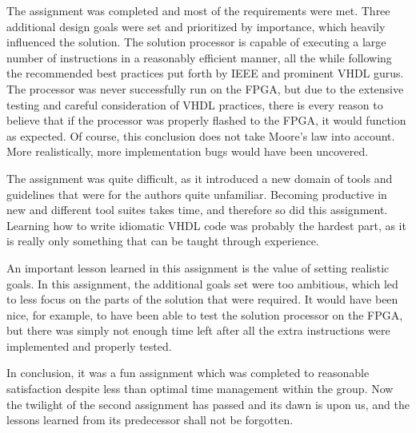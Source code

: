 The assignment was completed and most of the requirements were met.
Three additional design goals were set and prioritized by importance, which heavily influenced the solution.
The solution processor is capable of executing a large number of instructions in a reasonably efficient manner, all the while following the recommended best practices put forth by IEEE and prominent VHDL gurus.
The processor was never successfully run on the FPGA, but due to the extensive testing and careful consideration of VHDL practices, there is every reason to believe that if the processor was properly flashed to the FPGA, it would function as expected.
Of course, this conclusion does not take Moore's law into account.
More realistically, more implementation bugs would have been uncovered.

The assignment was quite difficult, as it introduced a new domain of tools and guidelines that were for the authors quite unfamiliar.
Becoming productive in new and different tool suites takes time, and therefore so did this assignment.
Learning how to write idiomatic VHDL code was probably the hardest part, as it is really only something that can be taught through experience.

An important lesson learned in this assignment is the value of setting realistic goals.
In this assignment, the additional goals set were too ambitious, which led to less focus on the parts of the solution that were required.
It would have been nice, for example, to have been able to test the solution processor on the FPGA, but there was simply not enough time left after all the extra instructions were implemented and properly tested.

In conclusion, it was a fun assignment which was completed to reasonable satisfaction despite less than optimal time management within the group.
Now the twilight of the second assignment has passed and its dawn is upon us, and the lessons learned from its predecessor shall not be forgotten.
